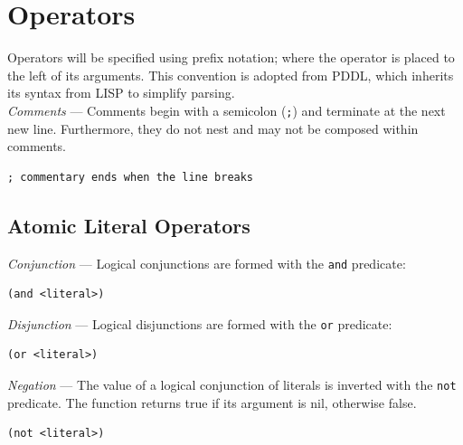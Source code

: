 \documentclass[
a4paper, %
11pt, %
onecolumn, %
openany, %
]{memoir}
\begin{document}
{\section{Operators}
Operators will be specified using prefix notation; where the operator is placed to the left of its arguments. This convention is adopted from PDDL, which inherits its syntax from LISP to simplify parsing.\\

\textit{Comments} --- Comments begin with a semicolon (\texttt{;}) and terminate at the next new line. Furthermore, they do not nest and may not be composed within comments.

\begin{lstlisting}
; commentary ends when the line breaks
\end{lstlisting}

\subsection{Atomic Literal Operators}

\textit{Conjunction} --- Logical conjunctions are formed with the \texttt{and} predicate: 

\begin{lstlisting}
(and <literal>)
\end{lstlisting}

\textit{Disjunction} --- Logical disjunctions are formed with the \texttt{or} predicate:

\begin{lstlisting}
(or <literal>)
\end{lstlisting}

\textit{Negation} --- The value of a logical conjunction of literals is inverted with the \texttt{not} predicate. The function returns true if its argument is nil, otherwise false.

\begin{lstlisting}
(not <literal>)
\end{lstlisting}


}
\end{document}
